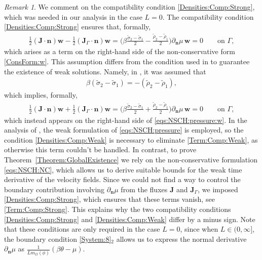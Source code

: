 \documentclass[10pt,reqno]{amsart}
\theoremstyle{remark}
\newtheorem{remark}[theorem]{Remark}
\numberwithin{equation}{section}
\newcommand{\n}{\mathbf{n}}
\newcommand{\bw}{\mathbf{w}}
\newcommand{\J}{\mathbf{J}}
\newcommand{\deln}{\partial_\n}
\newcommand{\Om}{\Omega}
\newcommand{\Ga}{\Gamma}
\begin{document}
\begin{remark}
    We comment on the compatibility condition \eqref{Densities:Comp:Strong}, which was needed in our analysis in the case $L = 0$. The compatibility condition \eqref{Densities:Comp:Strong} ensures that, formally,
        \begin{align}\label{Term:Comp:Strong}
        \frac12(\J\cdot\n)\bw - \frac12(\J_\Ga\cdot\n)\bw
        = \Big(\beta\frac{\tilde\sigma_2 - \tilde\sigma_1}{2} - \frac{\tilde\rho_2 - \tilde\rho_1}{2}\Big)\deln\mu\,\bw
        = 0 \qquad\text{on }\Ga,
        \end{align}
    which arises as a term on the right-hand side of the non-conservative form \eqref{ConsForm:w}. This assumption differs from the condition used in \cite[Theorem~4.2]{Knopf2025a} to guarantee the existence of weak solutions.
    Namely, in \cite{Knopf2025a}, it was assumed that
        \begin{align}\label{Densities:Comp:Weak}
            \beta(\tilde\sigma_2 - \tilde\sigma_1) = -(\tilde\rho_2 - \tilde\rho_1),
        \end{align}
    which implies, formally,
        \begin{align}\label{Term:Comp:Weak}
        \frac12(\J\cdot\n)\bw + \frac12(\J_\Ga\cdot\n)\bw
        = \Big(\beta\frac{\tilde\sigma_2 - \tilde\sigma_1}{2} + \frac{\tilde\rho_2 - \tilde\rho_1}{2}\Big)\deln\mu\,\bw
        = 0 \qquad\text{on }\Ga,
        \end{align}
    which instead appears on the right-hand side of \eqref{eqs:NSCH:pressure:w}. In the analysis of \cite{Knopf2025a}, the weak formulation of \eqref{eqs:NSCH:pressure} is employed, so the condition \eqref{Densities:Comp:Weak} is necessary to eliminate \eqref{Term:Comp:Weak}, as otherwise this term couldn't be handled. In contrast, to prove Theorem~\ref{Theorem:GlobalExistence} we rely on the non-conservative formulation \eqref{eqs:NSCH:NC}, which allows us to derive suitable bounds for the weak time derivative of the velocity fields. Since we could not find a way to control the boundary contribution involving $\deln\mu$ from the fluxes $\J$ and $\J_\Ga$, we imposed \eqref{Densities:Comp:Strong}, which ensures that these terms vanish, see \eqref{Term:Comp:Strong}. This explains why the two compatibility conditions \eqref{Densities:Comp:Strong} and \eqref{Densities:Comp:Weak} differ by a minus sign. Note that these conditions are only required in the case $L = 0$, since when $L\in(0,\infty]$, the boundary condition \eqref{System:8}$_2$ allows us to express the normal derivative $\deln\mu$ as $\tfrac{1}{Lm_\Om(\phi)}(\beta\theta - \mu)$.
    
\end{remark}
\end{document}

